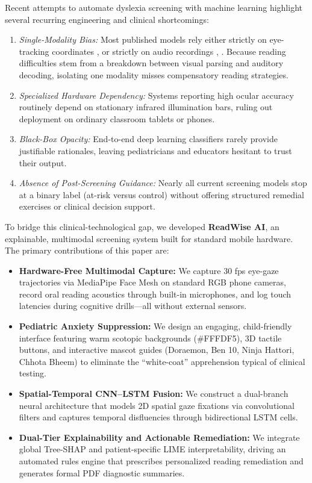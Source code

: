 \documentclass[conference]{IEEEtran}
\begin{document}
Recent attempts to automate dyslexia screening with machine learning highlight several recurring engineering and clinical shortcomings:
\begin{enumerate}
    \item \textit{Single-Modality Bias:} Most published models rely either strictly on eye-tracking coordinates \cite{b1}, \cite{b2} or strictly on audio recordings \cite{b8}, \cite{b9}. Because reading difficulties stem from a breakdown between visual parsing and auditory decoding, isolating one modality misses compensatory reading strategies.
    \item \textit{Specialized Hardware Dependency:} Systems reporting high ocular accuracy routinely depend on stationary infrared illumination bars, ruling out deployment on ordinary classroom tablets or phones.
    \item \textit{Black-Box Opacity:} End-to-end deep learning classifiers rarely provide justifiable rationales, leaving pediatricians and educators hesitant to trust their output.
    \item \textit{Absence of Post-Screening Guidance:} Nearly all current screening models stop at a binary label (at-risk versus control) without offering structured remedial exercises or clinical decision support.
\end{enumerate}

To bridge this clinical-technological gap, we developed \textbf{ReadWise AI}, an explainable, multimodal screening system built for standard mobile hardware. The primary contributions of this paper are:
\begin{itemize}
    \item \textbf{Hardware-Free Multimodal Capture:} We capture 30 fps eye-gaze trajectories via MediaPipe Face Mesh on standard RGB phone cameras, record oral reading acoustics through built-in microphones, and log touch latencies during cognitive drills—all without external sensors.
    \item \textbf{Pediatric Anxiety Suppression:} We design an engaging, child-friendly interface featuring warm scotopic backgrounds (\#FFFDF5), 3D tactile buttons, and interactive mascot guides (Doraemon, Ben 10, Ninja Hattori, Chhota Bheem) to eliminate the ``white-coat'' apprehension typical of clinical testing.
    \item \textbf{Spatial-Temporal CNN--LSTM Fusion:} We construct a dual-branch neural architecture that models 2D spatial gaze fixations via convolutional filters and captures temporal disfluencies through bidirectional LSTM cells.
    \item \textbf{Dual-Tier Explainability and Actionable Remediation:} We integrate global Tree-SHAP and patient-specific LIME interpretability, driving an automated rules engine that prescribes personalized reading remediation and generates formal PDF diagnostic summaries.
\end{itemize}
\end{document}
